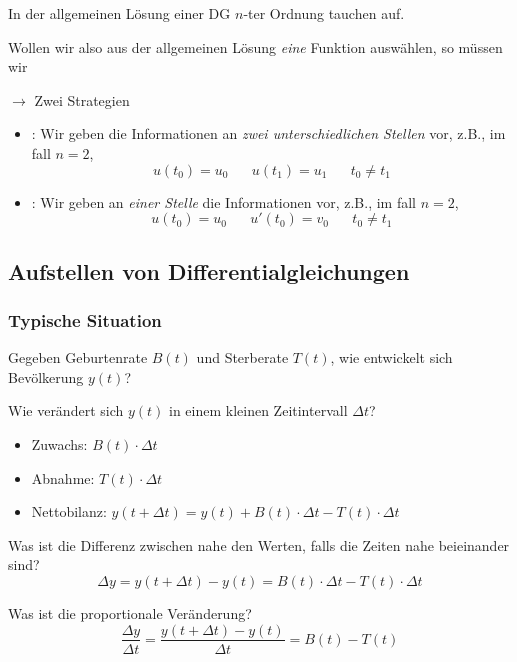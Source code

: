 In der allgemeinen Lösung einer DG $n$-ter Ordnung tauchen  auf.

Wollen wir also aus der allgemeinen Lösung \textit{eine} Funktion auswählen, so müssen wir 

$\to$ Zwei Strategien
\vspace{-0.6em}
\begin{itemize}
    \item {}: Wir geben die Informationen an \textit{zwei unterschiedlichen Stellen} vor, z.B., im fall $n = 2$,
    $$u(t_0) = u_0 \hspace{20pt} u(t_1) = u_1 \hspace{20pt} t_0 \ne t_1$$
    \item {}: Wir geben an \textit{einer Stelle} die Informationen vor, z.B., im fall $n = 2$,
    $$u(t_0) = u_0 \hspace{20pt} u'(t_0) = v_0 \hspace{20pt} t_0 \ne t_1$$
\end{itemize}

\subsection{Aufstellen von Differentialgleichungen}

\subsubsection{Typische Situation}

Gegeben Geburtenrate $B(t)$ und Sterberate $T(t)$, wie entwickelt sich Bevölkerung $y(t)$?

Wie verändert sich $y(t)$ in einem kleinen Zeitintervall $\Delta t$?
\vspace{-0.6em}
\begin{itemize}
    \item Zuwachs: $B(t) \cdot \Delta t$
    \item Abnahme: $T(t) \cdot \Delta t$
    \item Nettobilanz: $y(t + \Delta t) = y(t) + B(t) \cdot \Delta t - T(t) \cdot \Delta t$
\end{itemize}

Was ist die Differenz zwischen nahe den Werten, falls die Zeiten nahe beieinander sind?
$$\Delta y = y(t + \Delta t) - y(t) = B(t) \cdot \Delta t - T(t) \cdot \Delta t $$

Was ist die proportionale Veränderung?
$$\frac{\Delta y}{\Delta t} = \frac{y(t + \Delta t) - y(t)}{\Delta t} = B(t) - T(t)$$

